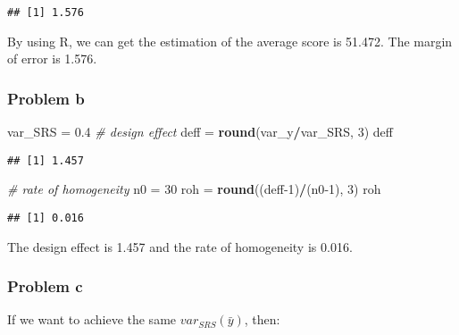 \documentclass[]{article}
\newenvironment{Shaded}{\begin{snugshade}}{\end{snugshade}}
\newcommand{\CommentTok}[1]{\textcolor[rgb]{0.56,0.35,0.01}{\textit{#1}}}
\newcommand{\DecValTok}[1]{\textcolor[rgb]{0.00,0.00,0.81}{#1}}
\newcommand{\FloatTok}[1]{\textcolor[rgb]{0.00,0.00,0.81}{#1}}
\newcommand{\KeywordTok}[1]{\textcolor[rgb]{0.13,0.29,0.53}{\textbf{#1}}}
\newcommand{\NormalTok}[1]{#1}
\newcommand{\OperatorTok}[1]{\textcolor[rgb]{0.81,0.36,0.00}{\textbf{#1}}}
\newcommand{\StringTok}[1]{\textcolor[rgb]{0.31,0.60,0.02}{#1}}
\begin{document}
\begin{verbatim}
## [1] 1.576
\end{verbatim}

By using R, we can get the estimation of the average score is 51.472.
The margin of error is 1.576.

\hypertarget{problem-b}{%
\subsubsection{Problem b}\label{problem-b}}

\begin{Shaded}
\begin{Highlighting}[]
\NormalTok{var_SRS =}\StringTok{ }\FloatTok{0.4}
\CommentTok{# design effect}
\NormalTok{deff =}\StringTok{ }\KeywordTok{round}\NormalTok{(var_y}\OperatorTok{/}\NormalTok{var_SRS, }\DecValTok{3}\NormalTok{)}
\NormalTok{deff}
\end{Highlighting}
\end{Shaded}

\begin{verbatim}
## [1] 1.457
\end{verbatim}

\begin{Shaded}
\begin{Highlighting}[]
\CommentTok{# rate of homogeneity}
\NormalTok{n0 =}\StringTok{ }\DecValTok{30}
\NormalTok{roh =}\StringTok{ }\KeywordTok{round}\NormalTok{((deff}\DecValTok{-1}\NormalTok{)}\OperatorTok{/}\NormalTok{(n0}\DecValTok{-1}\NormalTok{), }\DecValTok{3}\NormalTok{)}
\NormalTok{roh}
\end{Highlighting}
\end{Shaded}

\begin{verbatim}
## [1] 0.016
\end{verbatim}

The design effect is 1.457 and the rate of homogeneity is 0.016.

\hypertarget{problem-c}{%
\subsubsection{Problem c}\label{problem-c}}

If we want to achieve the same \(var_{SRS}(\bar y)\), then:

\begin{Shaded}
\end{Shaded}
\end{document}
